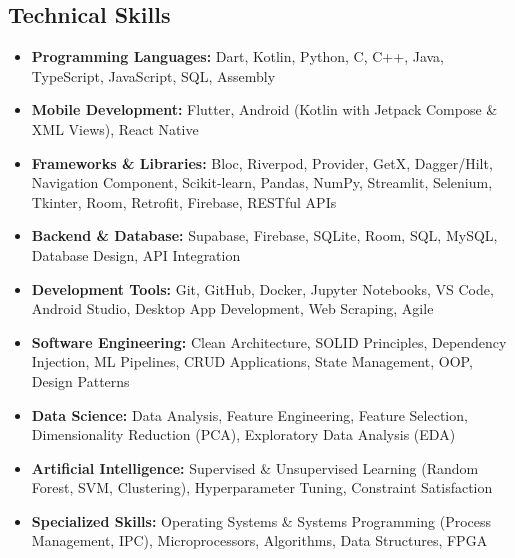 \documentclass[10pt, letterpaper]{article}
\newenvironment{highlights}{
\begin{itemize}[
topsep=0.10 cm,
parsep=0.10 cm,
partopsep=0pt,
itemsep=0pt,
leftmargin=0 cm + 10pt
]
}{
\end{itemize}
} %
\begin{document}
\vspace{0.2 cm}

\begin{samepage}
\section{Technical Skills}
\vspace{0.1cm}
\begin{highlights}
\item \textbf{Programming Languages:} Dart, Kotlin, Python, C, C++, Java, TypeScript, JavaScript, SQL, Assembly
\item \textbf{Mobile Development:} Flutter, Android (Kotlin with Jetpack Compose \& XML Views), React Native
\item \textbf{Frameworks \& Libraries:} Bloc, Riverpod, Provider, GetX, Dagger/Hilt, Navigation Component, Scikit-learn, Pandas, NumPy, Streamlit, Selenium, Tkinter, Room, Retrofit, Firebase, RESTful APIs
\item \textbf{Backend \& Database:} Supabase, Firebase, SQLite, Room, SQL, MySQL, Database Design, API Integration
\item \textbf{Development Tools:} Git, GitHub, Docker, Jupyter Notebooks, VS Code, Android Studio, Desktop App Development, Web Scraping, Agile
\item \textbf{Software Engineering:} Clean Architecture, SOLID Principles, Dependency Injection, ML Pipelines, CRUD Applications, State Management, OOP, Design Patterns
\item \textbf{Data Science:} Data Analysis, Feature Engineering, Feature Selection, Dimensionality Reduction (PCA), Exploratory Data Analysis (EDA)
\item \textbf{Artificial Intelligence:} Supervised \& Unsupervised Learning (Random Forest, SVM, Clustering), Hyperparameter Tuning, Constraint Satisfaction
\item \textbf{Specialized Skills:} Operating Systems \& Systems Programming (Process Management, IPC), Microprocessors, Algorithms, Data Structures, FPGA
\end{highlights}
\end{samepage}
\end{document}
